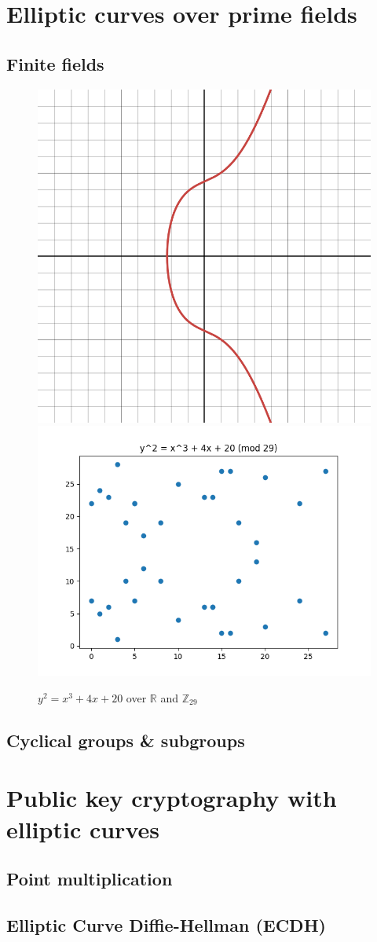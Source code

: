 \documentclass[a4paper]{article}
\begin{document}
\section{Elliptic curves over prime fields}

\subsection{Finite fields}

\begin{figure}[h]
    \centering
    \includegraphics[width=0.3\linewidth]{images/finite-graph.png}
    \includegraphics[width=0.4\linewidth]{images/finite-plt.png}
    \caption{$y^2=x^3+4x+20$ over $\mathbb{R}$ and $\mathbb{Z}_{29}$}
    \label{fig:finite}
\end{figure}

\subsection{Cyclical groups \& subgroups}


\section{Public key cryptography with elliptic curves}

\subsection{Point multiplication}

\subsection{Elliptic Curve Diffie-Hellman (ECDH)}


\newpage


\end{document}
